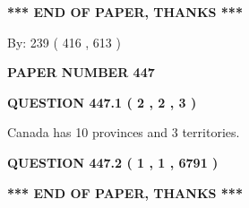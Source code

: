 \documentclass[12pt]{article}
\begin{document}
 
 
 
   
   
 \vspace{0.2in}
 
   
   
   
   
\vspace{1.0in} 
{\textbf{\large{ *** END OF PAPER, THANKS *** }}} 
   
   
\hspace{1.0in} By: 
 239 ( 416 ,  613 )
   
   
   
   
\newpage 
\setcounter{page}{ 
   447001 } 
   
   
   
   
 {\textbf{ \Large{ PAPER NUMBER  447  }}}
   
   
\vspace{0.2in}
   
   
   
   
   
   
 \vspace{0.2in}
 
 
 
 
   
   
  
\vspace{0.2in}
  
{\textbf{\Large{QUESTION
447.1 
 ( 2 , 2 , 3 )
}}}
  
  
 
 
\noindent{}
 
 
Canada has 10  provinces and 3 territories.
 
 
 
 
  
\vspace{0.2in}
  
{\textbf{\Large{QUESTION
447.2 
 ( 1 , 1 , 6791 )
}}}
  
  
   
   
 \vspace{0.2in}
 
   
   
   
   
\vspace{1.0in} 
{\textbf{\large{ *** END OF PAPER, THANKS *** }}} 
   
\end{document}
